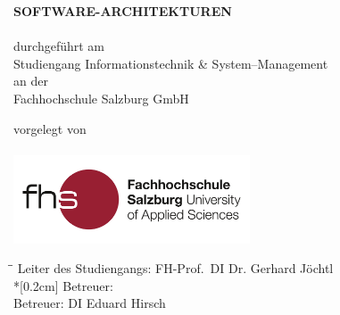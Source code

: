 
\begin{titlepage}

\hspace{7cm}

\begin{center}
	{\Large\uppercase\expandafter{\bf Software-Architekturen}}\\[0.5ex]
	\vspace{1cm}
	\Large{\bf\large \Title}\\
	\vspace{1.5cm}
	\normalsize durchgeführt am\\
	Studiengang Informationstechnik \& System--Management\\
	an der\\
	Fachhochschule Salzburg GmbH\\
\end{center}

\vspace{2cm}

\begin{center}
	\normalsize vorgelegt von
	\\
	{
		\Large{\bf\large \Author}\\
	}
	\vspace{2cm}
	\includegraphics[width=7cm]{BilderAllgemein/Logo.jpg}\medskip
\end{center}
	
\vspace{2cm}

\begin{tabbing}
	\hspace*{3cm}\=\hspace*{5.5 cm}\= \kill
	\> Leiter des Studiengangs: \> FH-Prof.~DI Dr. Gerhard Jöchtl \\*[0.2cm]
	\> Betreuer: \> \Advisor \\
	\> Betreuer: \> DI Eduard Hirsch
\end{tabbing}

\vfill	

\begin{center}
\VenueMonthYear\\
\end{center}
\end{titlepage}